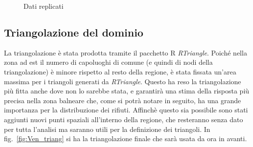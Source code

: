 \documentclass[a4paper,11pt,twoside,openright]{book}							%
\begin{document}
\begin{figure}[t]
\centering
{}
\caption{Dati replicati}
\label{fig:Ven_rep}
\end{figure}
\newpage

\subsection{Triangolazione del dominio}

La triangolazione è stata prodotta tramite il pacchetto R \textit{RTriangle}. Poiché nella zona ad est il numero di capoluoghi di comune (e quindi di nodi della triangolazione) è minore rispetto al resto della regione, è stata fissata un'area massima per i triangoli generati da \textit{RTriangle}. Questo ha reso la triangolazione più fitta anche dove non lo sarebbe stata, e garantirà una stima della risposta più precisa nella zona balneare che, come si potrà notare in seguito, ha una grande importanza per la distribuzione dei rifiuti. Affinchè questo sia possibile sono stati aggiunti nuovi punti spaziali all'interno della regione, che resteranno senza dato per tutta l'analisi ma saranno utili per la definizione dei triangoli. In fig.~\ref{fig:Ven_triang} si ha la triangolazione finale che sarà usata da ora in avanti.
\end{document}

